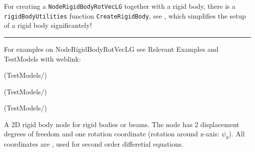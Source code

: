     For creating a \texttt{NodeRigidBodyRotVecLG} together with a rigid body, there is a \texttt{rigidBodyUtilities} function \texttt{CreateRigidBody}, 
    see , which simplifies the setup of a rigid body significantely!
\vspace{6pt}\par\noindent\rule{\textwidth}{0.4pt}
%
\noindent For examples on NodeRigidBodyRotVecLG see Relevant Examples and TestModels with weblink:
\bi
\item {} (TestModels/)
\item {} (TestModels/)
\item {} (TestModels/)

\ei

%
\newpage


\label{sec:item:NodeRigidBody2D}
A 2D rigid body node for rigid bodies or beams. The node has 2 displacement degrees of freedom and one rotation coordinate (rotation around z-axis: $\psi_0$). All coordinates are , used for second order differetial equations.
\vspace{12pt}\\

